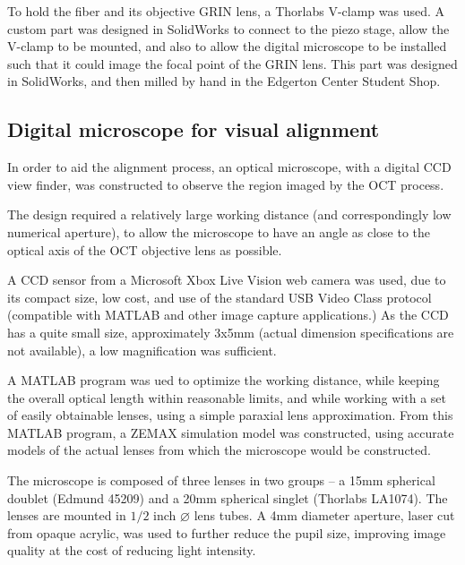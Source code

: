 To hold the fiber and its objective GRIN lens, a Thorlabs V-clamp was used. A custom part was designed in SolidWorks to connect to the piezo stage, allow the V-clamp to be mounted, and also to allow the digital microscope to be installed such that it could image the focal point of the GRIN lens. This part was designed in SolidWorks, and then milled by hand in the Edgerton Center Student Shop.

\subsection{Digital microscope for visual alignment}


In order to aid the alignment process, an optical microscope, with a digital CCD view finder, was constructed to observe the region imaged by the OCT process.

The design required a relatively large working distance (and correspondingly low numerical aperture), to allow the microscope to have an angle as close to the optical axis of the OCT objective lens as possible.

A CCD sensor from a Microsoft Xbox Live Vision web camera was used, due to its compact size, low cost, and use of the standard USB Video Class protocol (compatible with MATLAB and other image capture applications.) As the CCD has a quite small size, approximately 3x5mm (actual dimension specifications are not available), a low magnification was sufficient.

A MATLAB program was ued to optimize the working distance, while keeping the overall optical length within reasonable limits, and while working with a set of easily obtainable lenses, using a simple paraxial lens approximation. From this MATLAB program, a ZEMAX simulation model was constructed, using accurate models of the actual lenses from which the microscope would be constructed.

The microscope is composed of three lenses in two groups -- a 15mm spherical doublet (Edmund 45209) and a 20mm spherical singlet (Thorlabs LA1074). The lenses are mounted in $1/2$ inch $\diameter$ lens tubes. A 4mm diameter aperture, laser cut from opaque acrylic, was used to further reduce the pupil size, improving image quality at the cost of reducing light intensity.

